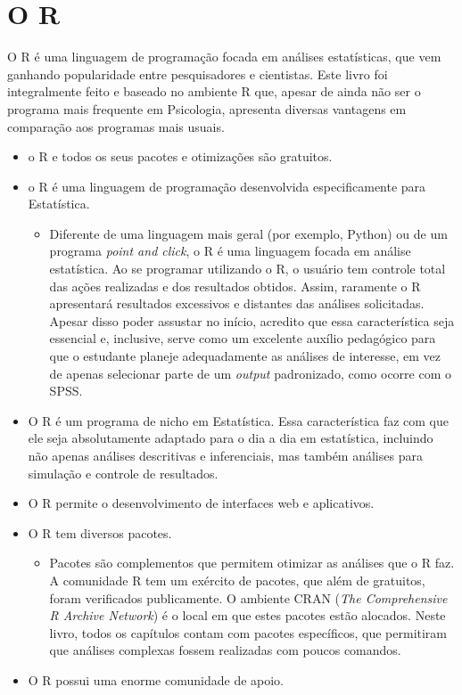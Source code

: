 \documentclass[
]{book}
\providecommand{\tightlist}{%
  \setlength{\itemsep}{0pt}\setlength{\parskip}{0pt}}
\begin{document}
\hypertarget{o-r}{%
\section{O R}\label{o-r}}

O R é uma linguagem de programação focada em análises estatísticas, que vem ganhando popularidade entre pesquisadores e cientistas. Este livro foi integralmente feito e baseado no ambiente R que, apesar de ainda não ser o programa mais frequente em Psicologia, apresenta diversas vantagens em comparação aos programas mais usuais.

\begin{itemize}
\item
  o R e todos os seus pacotes e otimizações são gratuitos.
\item
  o R é uma linguagem de programação desenvolvida especificamente para Estatística.

  \begin{itemize}
  \tightlist
  \item
    Diferente de uma linguagem mais geral (por exemplo, Python) ou de um programa \emph{point and click}, o R é uma linguagem focada em análise estatística. Ao se programar utilizando o R, o usuário tem controle total das ações realizadas e dos resultados obtidos. Assim, raramente o R apresentará resultados excessivos e distantes das análises solicitadas. Apesar disso poder assustar no início, acredito que essa característica seja essencial e, inclusive, serve como um excelente auxílio pedagógico para que o estudante planeje adequadamente as análises de interesse, em vez de apenas selecionar parte de um \emph{output} padronizado, como ocorre com o SPSS.
  \end{itemize}
\item
  O R é um programa de nicho em Estatística. Essa característica faz com que ele seja absolutamente adaptado para o dia a dia em estatística, incluindo não apenas análises descritivas e inferenciais, mas também análises para simulação e controle de resultados.
\item
  O R permite o desenvolvimento de interfaces web e aplicativos.
\item
  O R tem diversos pacotes.

  \begin{itemize}
  \tightlist
  \item
    Pacotes são complementos que permitem otimizar as análises que o R faz. A comunidade R tem um exército de pacotes, que além de gratuitos, foram verificados publicamente. O ambiente CRAN (\emph{The Comprehensive R Archive Network}) é o local em que estes pacotes estão alocados. Neste livro, todos os capítulos contam com pacotes específicos, que permitiram que análises complexas fossem realizadas com poucos comandos.
  \end{itemize}
\item
  O R possui uma enorme comunidade de apoio.


\end{itemize}
\end{document}
